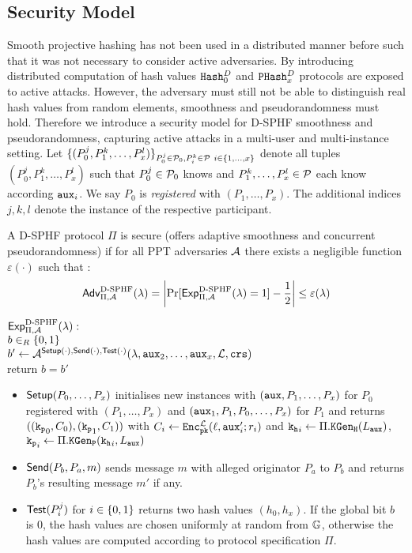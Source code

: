 \subsection{Security Model}
Smooth projective hashing has not been used in a distributed manner before such that it was not necessary to consider active adversaries.
By introducing distributed computation of hash values $\mathtt{Hash}_0^D$ and $\mathtt{PHash}_x^D$ protocols are exposed to active attacks.
However, the adversary must still not be able to distinguish real hash values from random elements, \ie smoothness and pseudorandomness must hold.
Therefore we introduce a security model for \ac{D-SPHF} smoothness and pseudorandomness, capturing active attacks in a multi-user and multi-instance setting.
Let $\{(P^j_0,P^k_1,\dots,P^l_x)\}_{P_0^j\in\mathcal{P}_0,P^k_i\in\mathcal{P}~i\in\{1,\dots,x\}}$ denote all tuples $(P^j_0,P^k_1,\dots,P^l_x)$ such that $P^j_0\in\mathcal{P}_0$ knows \aux and $P^k_1,\dots,P^l_x\in\mathcal{P}$ each know according $\mathtt{aux}_i$.
We say $P_0$ is \emph{registered} with $(P_1,\dots,P_x)$.
The additional indices $j,k,l$ denote the instance of the respective participant.

\begin{definition}\label{def:activesphff}
A \ac{D-SPHF} protocol $\Pi$ is secure (offers adaptive smoothness and concurrent pseudorandomness) if for all \ac{PPT} adversaries $\mathcal{A}$ there exists a negligible function $\varepsilon(\cdot)$ such that :
\[\mathsf{Adv}_{\Pi,\mathcal{A}}^{\text{D-SPHF}}(\lambda)=\left|\Pr[\mathsf{Exp}^{\text{D-SPHF}}_{\Pi,\mathcal{A}}(\lambda)=1]-\frac12\right|\leq\varepsilon(\lambda)\]

\noindent
$\mathsf{Exp}^{\text{D-SPHF}}_{\Pi,\mathcal{A}}(\lambda):$ \\
\hspace*{2em} $b\in_R\{0,1\}$ \\
\hspace*{2em} $b'\gets\mathcal{A}^{\mathsf{Setup}(\cdot),\mathsf{Send}(\cdot),\mathsf{Test}(\cdot)}(\lambda,\mathtt{aux}_2,\dots,\allowbreak \mathtt{aux}_x,\mathcal{L},\mathtt{crs})$ \\
\hspace*{2em} return $b=b'$

\begin{itemize}
	\item $\mathsf{Setup}(P_0,\dots,P_x)$ initialises new instances with $(\mathtt{aux},P_1,\dots,P_x)$ for $P_0$ registered with $(P_1,\dots,P_x)$ and $(\mathtt{aux}_1,P_1,P_0,\dots,P_x)$ for $P_1$ and returns $((\mathtt{k_p}_0,\allowbreak C_0),(\mathtt{k_p}_1,C_1))$ with $C_i\gets\mathtt{Enc}_{\mathtt{pk}}^{\mathcal{L}}(\ell,\mathtt{aux}'_i;r_i)$ and $\mathtt{k_h}_i\gets\Pi.\mathtt{KGen_H}(L_\mathtt{aux})$, $\mathtt{k_p}_i\gets\Pi.\mathtt{KGen_P}(\mathtt{k_h}_i,L_\mathtt{aux})$
		
	\item $\mathsf{Send}(P_b,P_a,m)$ sends message $m$ with alleged originator $P_a$ to $P_b$ and returns $P_b$'s resulting message $m'$ if any.
	
	\item $\mathsf{Test}(P_i^j)$ for $i\in\{0,1\}$ returns two hash values $(h_0,h_x)$. If the global bit $b$ is $0$, the hash values are chosen uniformly at random from $\mathbb{G}$, otherwise the hash values are computed according to protocol specification $\Pi$. \eod
\end{itemize}
\end{definition}

